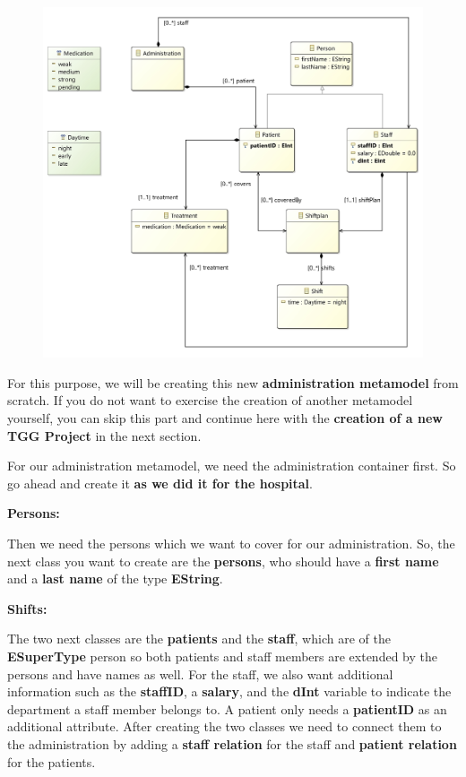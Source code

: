 \begin{figure}[h]
    \centering
    \includegraphics[scale=0.05 ]{pictures/AdministrationExample class diagram.jpg}
    \caption{}
    \label{Administration model}
\end{figure}

\clearpage

For this purpose, we will be creating this new \textbf{administration metamodel} from scratch. If you do not want to exercise the creation of another metamodel yourself, you can skip this part and continue here with the \textbf{creation of a new TGG Project} in the next section.\newline

For our administration metamodel, we need the administration container first. So go ahead and create it \textbf{as we did it for the hospital}.\newline

\textbf{Persons:}

Then we need the persons which we want to cover for our administration. So, the next class you want to create are the \textbf{persons}, who should have a \textbf{first name} and a \textbf{last name} of the type \textbf{EString}.\newline

\textbf{Shifts:}

The two next classes are the \textbf{patients} and the \textbf{staff}, which are of the \textbf{ESuperType} person so both patients and staff members are extended by the persons and have names as well. For the staff, we also want additional information such as the \textbf{staffID}, a \textbf{salary}, and the \textbf{dInt} variable to indicate the department a staff member belongs to. A patient only needs a \textbf{patientID} as an additional attribute. After creating the two classes we need to connect them to the administration by adding a \textbf{staff relation} for the staff and \textbf{patient relation} for the patients.\newline

